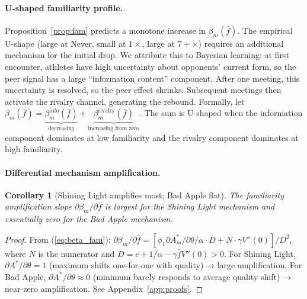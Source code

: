 \documentclass[12pt]{article}
\newtheorem{corollary}{Corollary}
\theoremstyle{definition}
\theoremstyle{remark}
\begin{document}
\paragraph{U-shaped familiarity profile.}
Proposition~\ref{prop:fam} predicts a monotone increase in $\beta_m(\bar{f})$.
The empirical U-shape (large at Never, small at $1\times$, large at $7+\times$)
requires an additional mechanism for the initial drop.
We attribute this to Bayesian learning: at first encounter, athletes have
high uncertainty about opponents' current form, so the peer signal has a large
``information content'' component.
After one meeting, this uncertainty is resolved, so the peer effect shrinks.
Subsequent meetings then activate the rivalry channel, generating the rebound.
Formally, let $\beta_m(\bar{f}) = \underbrace{\beta_m^{\text{info}}(\bar{f})}_{\text{decreasing}} + \underbrace{\beta_m^{\text{rivalry}}(\bar{f})}_{\text{increasing from zero}}$.
The sum is U-shaped when the information component dominates at low familiarity
and the rivalry component dominates at high familiarity.

\paragraph{Differential mechanism amplification.}
\begin{corollary}[Shining Light amplifies most; Bad Apple flat]
\label{cor:diff_amp}
The familiarity amplification slope $\partial \beta_m/\partial\bar{f}$ is largest
for the Shining Light mechanism and essentially zero for the Bad Apple mechanism.
\end{corollary}

\begin{proof}
From (\ref{eq:beta_fam}):
$\partial \beta_m/\partial\bar{f} = [\phi_1 \partial A_m^*/\partial\theta / \alpha \cdot D
+ N \cdot \gamma V''(0)] / D^2$,
where $N$ is the numerator and $D = c + 1/\alpha - \gamma\bar{f} V''(0) > 0$.
For Shining Light, $\partial A^*/\partial\theta = 1$ (maximum shifts one-for-one
with quality) → large amplification.
For Bad Apple, $\partial A^*/\partial\theta \approx 0$ (minimum barely responds to
average quality shift) → near-zero amplification.
See Appendix~\ref{app:proofs}.
\end{proof}
\end{document}
